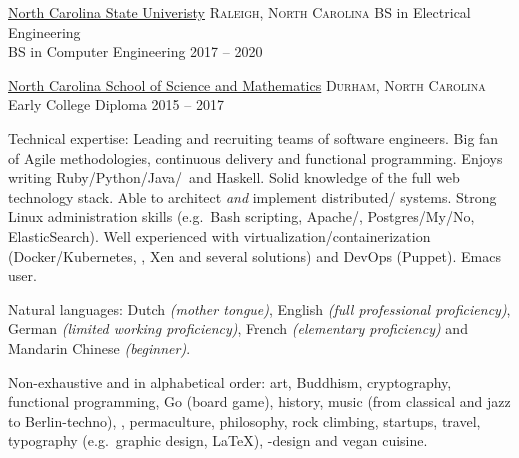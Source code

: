 \documentclass[10pt,letterpaper]{article}
\begin{document}
\spacedhrule{-0.2em}{-0.4em}


\headedsection
  {\href{https://www.ncsu.edu}{North Carolina State Univeristy}}
  {\textsc{Raleigh, North Carolina}} {%
  \headedsubsection
    {BS in Electrical Engineering \\BS in Computer Engineering}
    {2017 -- 2020}
    {}
}

\headedsection
  {\href{https://www.ncssm.edu/}{North Carolina School of Science and Mathematics}}
  {\textsc{Durham, North Carolina}} {
  \headedsubsection
    {Early College Diploma}
    {2015 -- 2017}
    {}
}

\spacedhrule{0.5em}{-0.4em}


\inlineheadsection  %
  {Technical expertise:}
  {Leading and recruiting teams of software engineers.  Big fan of Agile methodologies, continuous delivery and functional programming.  Enjoys writing Ruby/\nsp Python/\nsp Java/\nsp \CPP~and Haskell.  Solid knowledge of the full web technology stack.  Able to architect \textit{and} implement distributed/ systems.  Strong Linux administration skills (e.g.\ Bash scripting, Apache/, Postgres/My/No, ElasticSearch).  Well experienced with virtualization/containerization (Docker/Kubernetes, , Xen and several  solutions) and DevOps (Puppet).  Emacs user.}

\vspace{0.5em}
\inlineheadsection
  {Natural languages:}
  {Dutch \emph{(mother tongue)}, English \emph{(full professional proficiency)}, German \emph{(limited working proficiency)}, French \emph{(elementary proficiency)} and Mandarin Chinese \emph{(beginner)}.}


\spacedhrule{1.6em}{-0.4em}


\inlineheadsection
  {Non-exhaustive and in alphabetical order:}
  {art, Buddhism, cryptography, functional programming, Go (board game), history, music (from classical and jazz to Berlin-techno), , permaculture, philosophy, rock climbing, startups, travel, typography (e.g.\ graphic design, \LaTeX), -design and vegan cuisine.}
\end{document}
